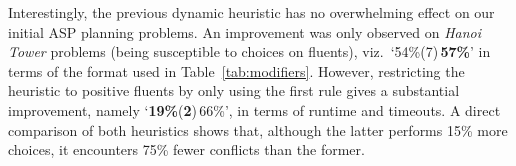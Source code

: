 Interestingly, the previous dynamic heuristic has no overwhelming effect on our initial ASP planning problems.
An improvement was only observed on \textit{Hanoi Tower} problems (being susceptible to choices on fluents),
viz.\ `{54\%}(7)\,\textbf{57\%}' in terms of the format used in Table~\ref{tab:modifiers}.
However, restricting the heuristic to positive fluents by only using the first rule gives a substantial
improvement, namely `\textbf{19\%}(\textbf{2})\,{66\%}', in terms of runtime and timeouts.
A direct comparison of both heuristics shows that, although the latter performs 15\% more choices, 
it encounters 75\% fewer conflicts than the former.


